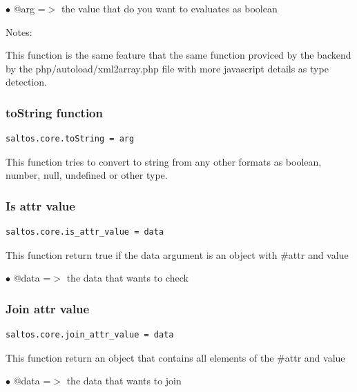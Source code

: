 \documentclass[a4paper]{article}
\begin{document}
\begin{compactitem}
\item[\color{myblue}$\bullet$] @arg =$>$ the value that do you want to evaluates as boolean
\end{compactitem}

Notes:

This function is the same feature that the same function proviced by the backend by the
php/autoload/xml2array.php file with more javascript details as type detection.

\hypertarget{toc152}{}
\subsubsection{toString function}

\begin{lstlisting}
saltos.core.toString = arg
\end{lstlisting}

This function tries to convert to string from any other formats as boolean,
number, null, undefined or other type.

\hypertarget{toc153}{}
\subsubsection{Is attr value}

\begin{lstlisting}
saltos.core.is_attr_value = data
\end{lstlisting}

This function return true if the data argument is an object with \#attr and value

\begin{compactitem}
\item[\color{myblue}$\bullet$] @data =$>$ the data that wants to check
\end{compactitem}

\hypertarget{toc154}{}
\subsubsection{Join attr value}

\begin{lstlisting}
saltos.core.join_attr_value = data
\end{lstlisting}

This function return an object that contains all elements of the \#attr and value

\begin{compactitem}
\item[\color{myblue}$\bullet$] @data =$>$ the data that wants to join
\end{compactitem}
\end{document}
